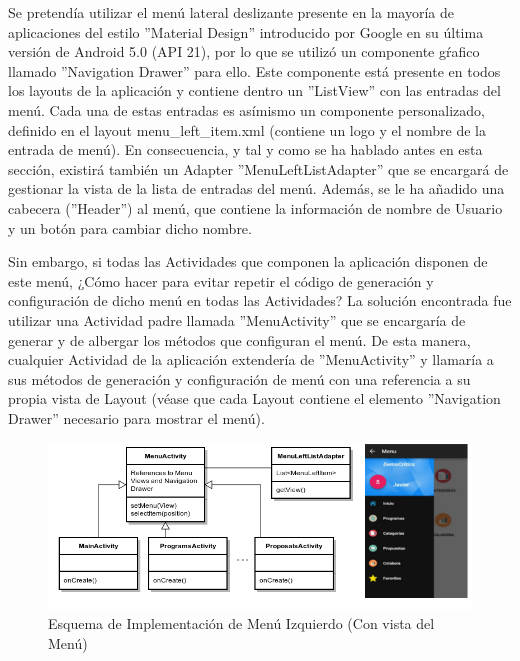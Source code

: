 		Se pretendía utilizar el menú lateral deslizante presente en la mayoría de aplicaciones del estilo ''Material Design'' introducido por Google en su última versión de Android 5.0 (API 21), por lo que se utilizó un componente gŕafico llamado ''Navigation Drawer'' para ello. Este componente está presente en todos los layouts de la aplicación y contiene dentro un ''ListView'' con las entradas del menú. Cada una de estas entradas es asímismo un componente personalizado, definido en el layout menu\_left\_item.xml (contiene un logo y el nombre de la entrada de menú). En consecuencia, y tal y como se ha hablado antes en esta sección, existirá también un Adapter ''MenuLeftListAdapter'' que se encargará de gestionar la vista de la lista de entradas del menú. Además, se le ha añadido una cabecera (''Header'') al menú, que contiene la información de nombre de Usuario y un botón para cambiar dicho nombre.
		
		Sin embargo, si todas las Actividades que componen la aplicación disponen de este menú, ¿Cómo hacer para evitar repetir el código de generación y configuración de dicho menú en todas las Actividades? La solución encontrada fue utilizar una Actividad padre llamada ''MenuActivity'' que se encargaría de generar y de albergar los métodos que configuran el menú. De esta manera, cualquier Actividad de la aplicación extendería de ''MenuActivity'' y llamaría a sus métodos de generación y configuración de menú con una referencia a su propia vista de Layout (véase que cada Layout contiene el elemento ''Navigation Drawer'' necesario para mostrar el menú).
		
	\begin{figure}[H]
	  \centering
	    \includegraphics[keepaspectratio, scale=0.6]{Media/Diagrams/classMenuLeft.png}
	  \caption{Esquema de Implementación de Menú Izquierdo (Con vista del Menú)}
	  \label{fig:topItemArch}
	\end{figure}	
	
